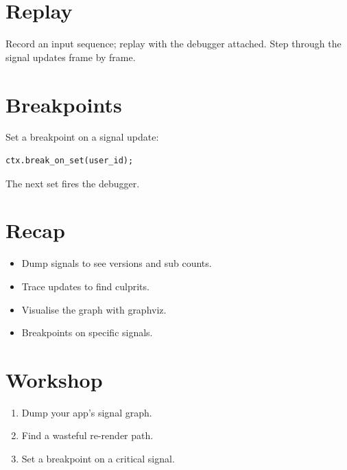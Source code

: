 \section{Replay}

Record an input sequence; replay with the debugger
attached. Step through the signal updates frame by frame.

\section{Breakpoints}

Set a breakpoint on a signal update:

\begin{lstlisting}
ctx.break_on_set(user_id);
\end{lstlisting}

The next set fires the debugger.

\section{Recap}

\begin{recap}
\begin{itemize}[leftmargin=*]
  \item Dump signals to see versions and sub counts.
  \item Trace updates to find culprits.
  \item Visualise the graph with graphviz.
  \item Breakpoints on specific signals.
\end{itemize}
\end{recap}

\section*{Workshop}

\begin{enumerate}[leftmargin=*]
  \item Dump your app's signal graph.
  \item Find a wasteful re-render path.
  \item Set a breakpoint on a critical signal.
\end{enumerate}
